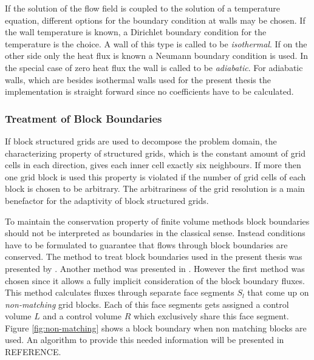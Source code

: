 If the solution of the flow field is coupled to the solution of a temperature equation, different options for the boundary condition at walls may be chosen. If the wall temperature is known, a Dirichlet boundary condition for the temperature is the choice. A wall of this type is called to be \emph{isothermal}. If on the other side only the heat flux is known a Neumann boundary condition is used. In the special case of zero heat flux the wall is called to be \emph{adiabatic}. For adiabatic walls, which are besides isothermal walls used for the present thesis the implementation is straight forward since no coefficients have to be calculated.

\subsubsection{Treatment of Block Boundaries}
\label{sec:blockboundaries}

If block structured grids are used to decompose the problem domain, the characterizing property of structured grids, which is the constant amount of grid cells in each direction, gives each inner cell exactly six neighbours. If more then one grid block is used this property is violated if the number of grid cells of each block is chosen to be arbitrary. The arbitrariness of the grid resolution is a main benefactor for the adaptivity of block structured grids.

To maintain the conservation property of finite volume methods block boundaries should not be interpreted as boundaries in the classical sense. Instead conditions have to be formulated to guarantee that flows through block boundaries are conserved. The method to treat block boundaries used in the present thesis was presented by \cite{lilek97}. Another method was presented in \cite{lange02}. However the first method was chosen since it allows a fully implicit consideration of the block boundary fluxes. This method calculates fluxes through separate face segments \(S_l\) that come up on \emph{non-matching} grid blocks. Each of this face segments gets assigned a control volume \(L\) and a control volume \(R\) which exclusively share this face segment. Figure \ref{fig:non-matching} shows a block boundary when non matching blocks are used. An algorithm to provide this needed information will be presented in REFERENCE.


